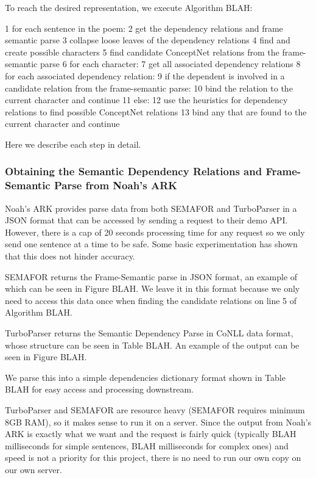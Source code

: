 To reach the desired representation, we execute Algorithm BLAH:

1 for each sentence in the poem:
2   get the dependency relations and frame semantic parse
3	collapse loose leaves of the dependency relations
4	find and create possible characters
5	find candidate ConceptNet relations from the frame-semantic parse
6	for each character:
7		get all associated dependency relations
8		for each associated dependency relation:
9			if the dependent is involved in a candidate relation from the frame-semantic parse:
10				bind the relation to the current character and continue
11			else:
12				use the heuristics for dependency relations to find possible ConceptNet relations
13				bind any that are found to the current character and continue
				
Here we describe each step in detail.

\subsubsection{Obtaining the Semantic Dependency Relations and Frame-Semantic Parse from Noah's ARK}

Noah's ARK provides parse data from both SEMAFOR and TurboParser in a JSON format that can be accessed by sending a request to their demo API. However, there is a cap of 20 seconds processing time for any request so we only send one sentence at a time to be safe. Some basic experimentation has shown that this does not hinder accuracy.

SEMAFOR returns the Frame-Semantic parse in JSON format, an example of which can be seen in Figure BLAH. We leave it in this format because we only need to access this data once when finding the candidate relations on line 5 of Algorithm BLAH.

TurboParser returns the Semantic Dependency Parse in CoNLL data format, whose structure can be seen in Table BLAH. An example of the output can be seen in Figure BLAH.

We parse this into a simple dependencies dictionary format shown in Table BLAH for easy access and processing downstream. 

TurboParser and SEMAFOR are resource heavy (SEMAFOR requires minimum 8GB RAM), so it makes sense to run it on a server. Since the output from Noah's ARK is exactly what we want and the request is fairly quick (typically BLAH milliseconds for simple sentences, BLAH milliseconds for complex ones) and speed is not a priority for this project, there is no need to run our own copy on our own server.

